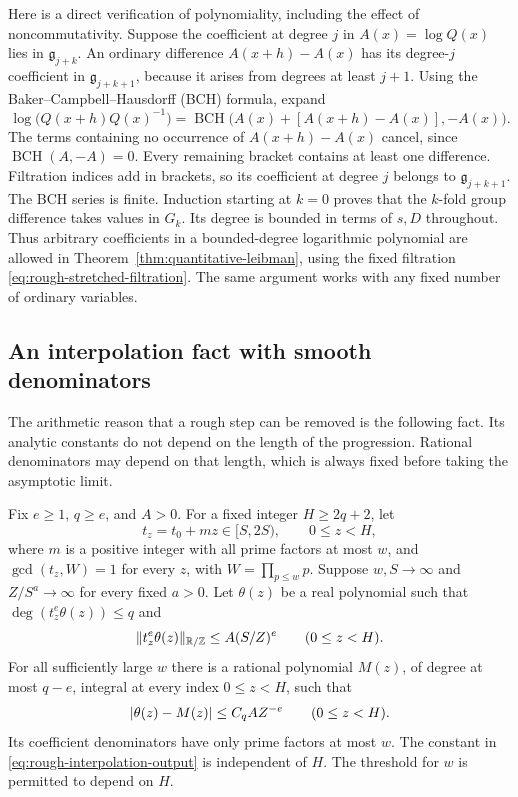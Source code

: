 Here is a direct verification of polynomiality, including the effect
of noncommutativity.  Suppose the coefficient at degree $j$ in
$A(x)=\log Q(x)$ lies in $\mathfrak g_{j+k}$.  An ordinary difference
$A(x+h)-A(x)$ has its degree-$j$ coefficient in
$\mathfrak g_{j+k+1}$, because it arises from degrees at least $j+1$.
Using the Baker--Campbell--Hausdorff (BCH) formula, expand
\[
 \log\bigl(Q(x+h)Q(x)^{-1}\bigr)
   =\operatorname{BCH}\bigl(A(x)+[A(x+h)-A(x)],-A(x)\bigr).
\]
The terms containing no occurrence of $A(x+h)-A(x)$ cancel, since
$\operatorname{BCH}(A,-A)=0$.  Every remaining bracket contains at
least one difference.  Filtration indices add in brackets, so its
coefficient at degree $j$ belongs to $\mathfrak g_{j+k+1}$.
The BCH series is finite.  Induction starting at $k=0$ proves that the
$k$-fold group difference takes values in $G_k$.  Its degree is bounded
in terms of $s,D$ throughout.  Thus arbitrary coefficients in a
bounded-degree logarithmic polynomial are allowed in
Theorem~\ref{thm:quantitative-leibman}, using the fixed filtration
\eqref{eq:rough-stretched-filtration}.  The same argument works with
any fixed number of ordinary variables.

\subsection{An interpolation fact with smooth denominators}

The arithmetic reason that a rough step can be removed is the following
fact.  Its analytic constants do not depend on the length of the
progression.  Rational denominators may depend on that length, which is
always fixed before taking the asymptotic limit.

\begin{lemma}
\label{lem:rough-interpolation}
Fix $e\geq1$, $q\geq e$, and $A>0$.  For a fixed integer
$H\geq2q+2$, let
\[
 t_z=t_0+mz\in[S,2S),\qquad 0\leq z<H,
\]
where $m$ is a positive integer with all prime factors at most $w$, and
$\gcd(t_z,W)=1$ for every $z$, with $W=\prod_{p\leq w}p$.
Suppose $w,S\to\infty$ and $Z/S^a\to\infty$ for every fixed $a>0$.
Let $\theta(z)$ be a real polynomial such that
$\deg(t_z^e\theta(z))\leq q$ and
\begin{equation}
 \lVert t_z^e\theta(z)\rVert_{\mathbb R/\mathbb Z}\leq A(S/Z)^e
 \qquad(0\leq z<H).
 \label{eq:rough-interpolation-input}
\end{equation}
For all sufficiently large $w$ there is a rational polynomial $M(z)$,
of degree at most $q-e$, integral at every index $0\leq z<H$, such that
\begin{equation}
 \lvert\theta(z)-M(z)\rvert\leq C_{q}A Z^{-e}
 \qquad(0\leq z<H).
 \label{eq:rough-interpolation-output}
\end{equation}
Its coefficient denominators have only prime factors at most $w$.
The constant in \eqref{eq:rough-interpolation-output} is independent of
$H$.  The threshold for $w$ is permitted to depend on $H$.
\end{lemma}

